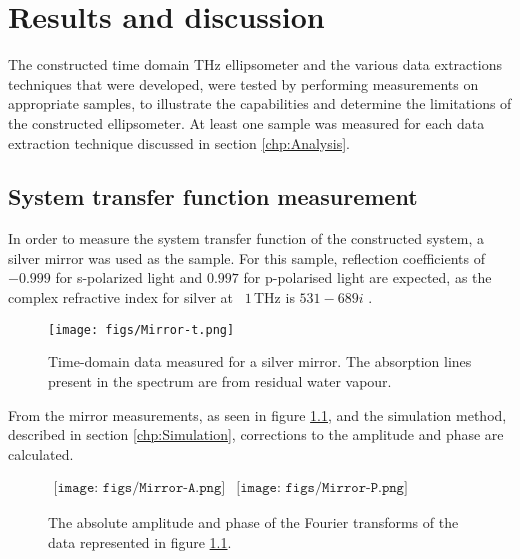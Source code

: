 \chapter{Results and discussion}
\label{chp:Results}

The constructed time domain THz ellipsometer and the various data extractions techniques that were developed, were tested by performing measurements on appropriate samples, to illustrate the capabilities and determine the limitations of the constructed ellipsometer. At least one sample was measured for each data extraction technique discussed in section \ref{chp:Analysis}.

\section{System transfer function measurement}
\label{sec: Mir}

In order to measure the system transfer function of the constructed system, a silver mirror was used as the sample. For this sample, reflection coefficients of $-0.999$ for s-polarized light and $0.997$ for p-polarised light are expected, as the complex refractive index for silver at ~$1\,$THz is $531 - 689i$ \cite{rii}.

\begin{figure}[H]
\begin{center}
\texttt{[image: figs/Mirror-t.png]}
\end{center}
\caption[Time-domain measurement: Silver mirror]{\label{fig:MirrorE0t} Time-domain data measured for a silver mirror. The absorption lines present in the spectrum are from residual water vapour.}
\end{figure}

From the mirror measurements, as seen in figure \ref{fig:MirrorE0t}, and the simulation method, described in section \ref{chp:Simulation}, corrections to the amplitude and phase are calculated.

\begin{figure}[H]
                \begin{center}$
								\begin{array}{cc}
                \texttt{[image: figs/Mirror-A.png]}&
                \texttt{[image: figs/Mirror-P.png]}
								\end{array}$
								\end{center}
	\caption[FFT of measured mirror data]{The absolute amplitude and phase of the Fourier transforms of the data represented in figure \ref{fig:MirrorE0t}.}
	\label{fig:MirrorFFT}
\end{figure}


